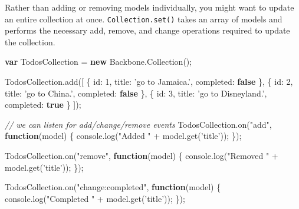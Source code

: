 \documentclass[9pt]{book}
\newenvironment{Shaded}{}{}
\newcommand{\KeywordTok}[1]{\textcolor[rgb]{0.00,0.44,0.13}{\textbf{{#1}}}}
\newcommand{\DataTypeTok}[1]{\textcolor[rgb]{0.56,0.13,0.00}{{#1}}}
\newcommand{\DecValTok}[1]{\textcolor[rgb]{0.25,0.63,0.44}{{#1}}}
\newcommand{\StringTok}[1]{\textcolor[rgb]{0.25,0.44,0.63}{{#1}}}
\newcommand{\CommentTok}[1]{\textcolor[rgb]{0.38,0.63,0.69}{\textit{{#1}}}}
\newcommand{\OtherTok}[1]{\textcolor[rgb]{0.00,0.44,0.13}{{#1}}}
\newcommand{\FunctionTok}[1]{\textcolor[rgb]{0.02,0.16,0.49}{{#1}}}
\newcommand{\NormalTok}[1]{{#1}}
\begin{document}
Rather than adding or removing models individually, you might want to
update an entire collection at once. \texttt{Collection.set()} takes an
array of models and performs the necessary add, remove, and change
operations required to update the collection.

\begin{Shaded}
\begin{Highlighting}[]
\KeywordTok{var} \NormalTok{TodosCollection = }\KeywordTok{new} \OtherTok{Backbone}\NormalTok{.}\FunctionTok{Collection}\NormalTok{();}

\OtherTok{TodosCollection}\NormalTok{.}\FunctionTok{add}\NormalTok{([}
    \NormalTok{\{ }\DataTypeTok{id}\NormalTok{: }\DecValTok{1}\NormalTok{, }\DataTypeTok{title}\NormalTok{: }\StringTok{'go to Jamaica.'}\NormalTok{, }\DataTypeTok{completed}\NormalTok{: }\KeywordTok{false} \NormalTok{\},}
    \NormalTok{\{ }\DataTypeTok{id}\NormalTok{: }\DecValTok{2}\NormalTok{, }\DataTypeTok{title}\NormalTok{: }\StringTok{'go to China.'}\NormalTok{, }\DataTypeTok{completed}\NormalTok{: }\KeywordTok{false} \NormalTok{\},}
    \NormalTok{\{ }\DataTypeTok{id}\NormalTok{: }\DecValTok{3}\NormalTok{, }\DataTypeTok{title}\NormalTok{: }\StringTok{'go to Disneyland.'}\NormalTok{, }\DataTypeTok{completed}\NormalTok{: }\KeywordTok{true} \NormalTok{\}}
\NormalTok{]);}

\CommentTok{// we can listen for add/change/remove events}
\OtherTok{TodosCollection}\NormalTok{.}\FunctionTok{on}\NormalTok{(}\StringTok{"add"}\NormalTok{, }\KeywordTok{function}\NormalTok{(model) \{}
  \OtherTok{console}\NormalTok{.}\FunctionTok{log}\NormalTok{(}\StringTok{"Added "} \NormalTok{+ }\OtherTok{model}\NormalTok{.}\FunctionTok{get}\NormalTok{(}\StringTok{'title'}\NormalTok{));}
\NormalTok{\});}

\OtherTok{TodosCollection}\NormalTok{.}\FunctionTok{on}\NormalTok{(}\StringTok{"remove"}\NormalTok{, }\KeywordTok{function}\NormalTok{(model) \{}
  \OtherTok{console}\NormalTok{.}\FunctionTok{log}\NormalTok{(}\StringTok{"Removed "} \NormalTok{+ }\OtherTok{model}\NormalTok{.}\FunctionTok{get}\NormalTok{(}\StringTok{'title'}\NormalTok{));}
\NormalTok{\});}

\OtherTok{TodosCollection}\NormalTok{.}\FunctionTok{on}\NormalTok{(}\StringTok{"change:completed"}\NormalTok{, }\KeywordTok{function}\NormalTok{(model) \{}
  \OtherTok{console}\NormalTok{.}\FunctionTok{log}\NormalTok{(}\StringTok{"Completed "} \NormalTok{+ }\OtherTok{model}\NormalTok{.}\FunctionTok{get}\NormalTok{(}\StringTok{'title'}\NormalTok{));}
\NormalTok{\});}


\end{Highlighting}
\end{Shaded}
\end{document}
